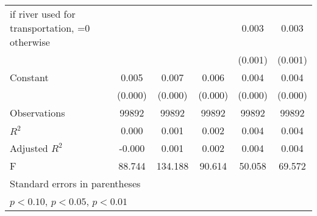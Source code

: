 {\begin{tabular}{l*{5}{c}}
\addlinespace
=1 if river used for transportation, =0 otherwise&                     &                     &                     &       0.003\sym{***}&       0.003\sym{***}\\
                    &                     &                     &                     &     (0.001)         &     (0.001)         \\
\addlinespace
Constant            &       0.005\sym{***}&       0.007\sym{***}&       0.006\sym{***}&       0.004\sym{***}&       0.004\sym{***}\\
                    &     (0.000)         &     (0.000)         &     (0.000)         &     (0.000)         &     (0.000)         \\
\midrule
Observations        &       99892         &       99892         &       99892         &       99892         &       99892         \\
\(R^{2}\)           &       0.000         &       0.001         &       0.002         &       0.004         &       0.004         \\
Adjusted \(R^{2}\)  &      -0.000         &       0.001         &       0.002         &       0.004         &       0.004         \\
F                   &      88.744         &     134.188         &      90.614         &      50.058         &      69.572         \\
\bottomrule
\multicolumn{6}{l}{\footnotesize Standard errors in parentheses}\\
\multicolumn{6}{l}{\footnotesize \sym{*} \(p<0.10\), \sym{**} \(p<0.05\), \sym{***} \(p<0.01\)}\\
\end{tabular}
}
